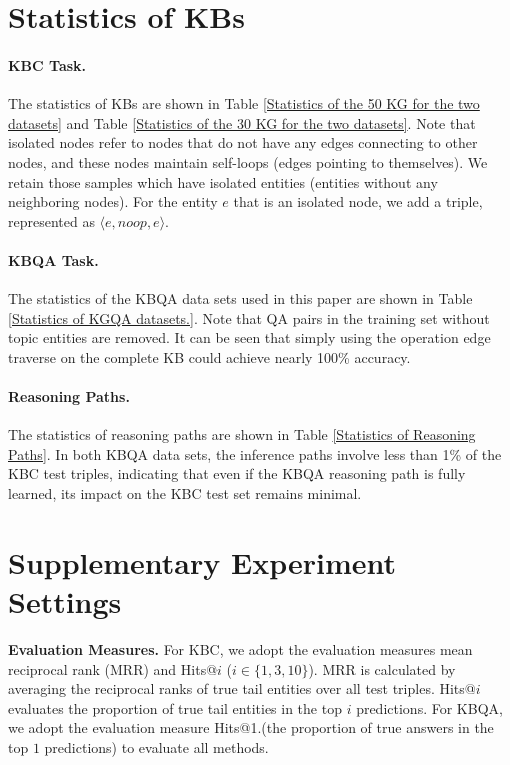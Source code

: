 \clearpage
\appendix

\section{Statistics of KBs} \label{appendix:dataset}

\paragraph{\textbf{KBC Task.}} The statistics of KBs are shown in Table \ref{Statistics of the 50 KG for the two datasets} and Table \ref{Statistics of the 30 KG for the two datasets}. Note that isolated nodes refer to nodes that do not have any edges connecting to other nodes, and these nodes maintain self-loops (edges pointing to themselves). We retain those samples which have isolated entities (entities without any neighboring nodes). For the entity $e$ that is an isolated node, we add a triple, represented as $\langle e, noop, e \rangle$.



\paragraph{\textbf{KBQA Task.}} The statistics of the KBQA data sets used in this paper are shown in Table \ref{Statistics of KGQA datasets.}. Note that QA pairs in the training set without topic entities are removed. It can be seen that simply using the operation edge traverse on the complete KB could achieve nearly 100\% accuracy.



\paragraph{\textbf{Reasoning Paths.}} The statistics of reasoning paths are shown in Table \ref{Statistics of Reasoning Paths}. In both KBQA data sets, the inference paths involve less than 1\% of the KBC test triples, indicating that even if the KBQA reasoning path is fully learned, its impact on the KBC test set remains minimal.



\section{Supplementary Experiment Settings} \label{appendix:settings}
\textbf{Evaluation Measures.} For KBC, we adopt the evaluation measures mean reciprocal rank (MRR) and Hits@$i$ ($i \in \{1, 3, 10\}$). MRR is calculated by averaging the reciprocal ranks of true tail entities over all test triples. Hits@$i$ evaluates the proportion of true tail entities in the top $i$ predictions. 
For KBQA, we adopt the evaluation measure Hits@1.(the proportion of true answers in the top $1$ predictions) to evaluate all methods. 

